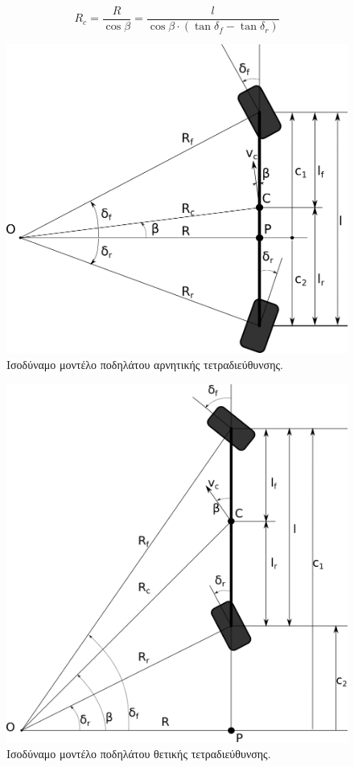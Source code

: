 \begin{equation}
	R_c = \frac{R}{\cos{\beta}} = \frac{l}{\cos{\beta} \cdot (\tan{\delta_f} - \tan{\delta_r})}
\end{equation}

\begin{figure}[!ht]
	\centering
	\includegraphics[width=0.6\linewidth]{Chapters/Chapter2/Figures/4ws_bicycle.png}
	\caption{Ισοδύναμο μοντέλο ποδηλάτου αρνητικής τετραδιεύθυνσης.}
	\label{fig:4ws_bicycle}
\end{figure}

\begin{figure}[!ht]
	\centering
	\includegraphics[width=0.6\linewidth]{Chapters/Chapter2/Figures/pos_4ws_bicycle_model.png}
	\caption{Ισοδύναμο μοντέλο ποδηλάτου θετικής τετραδιεύθυνσης.}
	\label{fig:pos_4ws_bicycle_model}
\end{figure}



